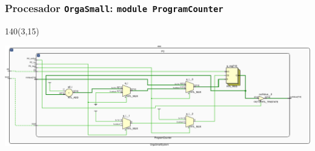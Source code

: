 \documentclass[aspectratio=169]{beamer}
\begin{document}
\begin{frame}[fragile,t]
    \frametitle{Procesador \texttt{OrgaSmall}: \texttt{module ProgramCounter}}
    \begin{textblock}{140}(3,15)
    \begin{center}
    \includegraphics[scale=0.81]{pdf/schematicPC-crop.pdf}
    \end{center}
    \end{textblock}
\end{frame}
\end{document}
